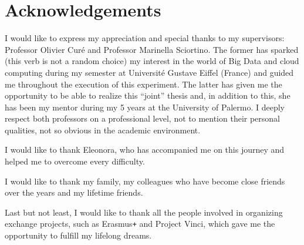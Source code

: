 \documentclass[10pt, a4paper]{report}
\begin{document}
\chapter*{Acknowledgements}

I would like to express my appreciation and special thanks to my supervisors: Professor Olivier Curé and Professor Marinella Sciortino. The former has sparked (this verb is not a random choice) my interest in the world of Big Data and cloud computing during my semester at Université Gustave Eiffel (France) and guided me throughout the execution of this experiment. The latter has given me the opportunity to be able to realize this ``joint'' thesis and, in addition to this, she has been my mentor during my 5 years at the University of Palermo. I deeply respect both professors on a professional level, not to mention their personal qualities, not so obvious in the academic environment.

I would like to thank Eleonora, who has accompanied me on this journey and helped me to overcome every difficulty.

I would like to thank my family, my colleagues who have become close friends over the years and my lifetime friends.

Last but not least, I would like to thank all the people involved in organizing exchange projects, such as Erasmus\texttt{+} and Project Vinci, which gave me the opportunity to fulfill my lifelong dreams.


\printbibliography
\end{document}
